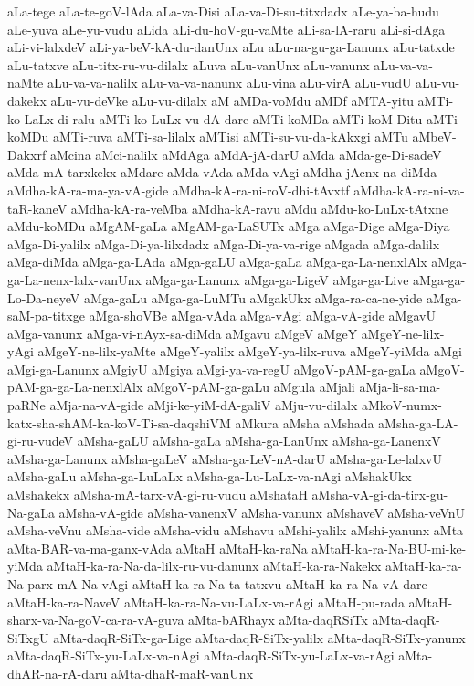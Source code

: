 {aLa-tege
aLa-te-goV-lAda
aLa-va-Disi
aLa-va-Di-su-titxdadx
aLe-ya-ba-hudu
aLe-yuva
aLe-yu-vudu
aLida
aLi-du-hoV-gu-vaMte
aLi-sa-lA-raru
aLi-si-dAga
aLi-vi-lalxdeV
aLi-ya-beV-kA-du-danUnx
aLu
aLu-na-gu-ga-Lanunx
aLu-tatxde
aLu-tatxve
aLu-titx-ru-vu-dilalx
aLuva
aLu-vanUnx
aLu-vanunx
aLu-va-va-naMte
aLu-va-va-nalilx
aLu-va-va-nanunx
aLu-vina
aLu-virA
aLu-vudU
aLu-vu-dakekx
aLu-vu-deVke
aLu-vu-dilalx
aM
aMDa-voMdu
aMDf
aMTA-yitu
aMTi-ko-LaLx-di-ralu
aMTi-ko-LuLx-vu-dA-dare
aMTi-koMDa
aMTi-koM-Ditu
aMTi-koMDu
aMTi-ruva
aMTi-sa-lilalx
aMTisi
aMTi-su-vu-da-kAkxgi
aMTu
aMbeV-Dakxrf
aMcina
aMci-nalilx
aMdAga
aMdA-jA-darU
aMda
aMda-ge-Di-sadeV
aMda-mA-tarxkekx
aMdare
aMda-vAda
aMda-vAgi
aMdha-jAcnx-na-diMda
aMdha-kA-ra-ma-ya-vA-gide
aMdha-kA-ra-ni-roV-dhi-tAvxtf
aMdha-kA-ra-ni-va-taR-kaneV
aMdha-kA-ra-veMba
aMdha-kA-ravu
aMdu
aMdu-ko-LuLx-tAtxne
aMdu-koMDu
aMgAM-gaLa
aMgAM-ga-LaSUTx
aMga
aMga-Dige
aMga-Diya
aMga-Di-yalilx
aMga-Di-ya-lilxdadx
aMga-Di-ya-va-rige
aMgada
aMga-dalilx
aMga-diMda
aMga-ga-LAda
aMga-gaLU
aMga-gaLa
aMga-ga-La-nenxlAlx
aMga-ga-La-nenx-lalx-vanUnx
aMga-ga-Lanunx
aMga-ga-LigeV
aMga-ga-Live
aMga-ga-Lo-Da-neyeV
aMga-gaLu
aMga-ga-LuMTu
aMgakUkx
aMga-ra-ca-ne-yide
aMga-saM-pa-titxge
aMga-shoVBe
aMga-vAda
aMga-vAgi
aMga-vA-gide
aMgavU
aMga-vanunx
aMga-vi-nAyx-sa-diMda
aMgavu
aMgeV
aMgeY
aMgeY-ne-lilx-yAgi
aMgeY-ne-lilx-yaMte
aMgeY-yalilx
aMgeY-ya-lilx-ruva
aMgeY-yiMda
aMgi
aMgi-ga-Lanunx
aMgiyU
aMgiya
aMgi-ya-va-regU
aMgoV-pAM-ga-gaLa
aMgoV-pAM-ga-ga-La-nenxlAlx
aMgoV-pAM-ga-gaLu
aMgula
aMjali
aMja-li-sa-ma-paRNe
aMja-na-vA-gide
aMji-ke-yiM-dA-galiV
aMju-vu-dilalx
aMkoV-numx-katx-sha-shAM-ka-koV-Ti-sa-daqshiVM
aMkura
aMsha
aMshada
aMsha-ga-LA-gi-ru-vudeV
aMsha-gaLU
aMsha-gaLa
aMsha-ga-LanUnx
aMsha-ga-LanenxV
aMsha-ga-Lanunx
aMsha-gaLeV
aMsha-ga-LeV-nA-darU
aMsha-ga-Le-lalxvU
aMsha-gaLu
aMsha-ga-LuLaLx
aMsha-ga-Lu-LaLx-va-nAgi
aMshakUkx
aMshakekx
aMsha-mA-tarx-vA-gi-ru-vudu
aMshataH
aMsha-vA-gi-da-tirx-gu-Na-gaLa
aMsha-vA-gide
aMsha-vanenxV
aMsha-vanunx
aMshaveV
aMsha-veVnU
aMsha-veVnu
aMsha-vide
aMsha-vidu
aMshavu
aMshi-yalilx
aMshi-yanunx
aMta
aMta-BAR-va-ma-ganx-vAda
aMtaH
aMtaH-ka-raNa
aMtaH-ka-ra-Na-BU-mi-ke-yiMda
aMtaH-ka-ra-Na-da-lilx-ru-vu-danunx
aMtaH-ka-ra-Nakekx
aMtaH-ka-ra-Na-parx-mA-Na-vAgi
aMtaH-ka-ra-Na-ta-tatxvu
aMtaH-ka-ra-Na-vA-dare
aMtaH-ka-ra-NaveV
aMtaH-ka-ra-Na-vu-LaLx-va-rAgi
aMtaH-pu-rada
aMtaH-sharx-va-Na-goV-ca-ra-vA-guva
aMta-bARhayx
aMta-daqRSiTx
aMta-daqR-SiTxgU
aMta-daqR-SiTx-ga-Lige
aMta-daqR-SiTx-yalilx
aMta-daqR-SiTx-yanunx
aMta-daqR-SiTx-yu-LaLx-va-nAgi
aMta-daqR-SiTx-yu-LaLx-va-rAgi
aMta-dhAR-na-rA-daru
aMta-dhaR-maR-vanUnx
}
